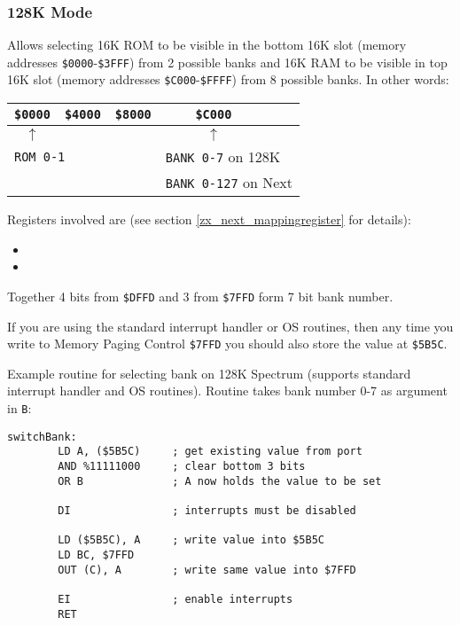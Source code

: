\documentclass[12pt,twoside,openright,a4paper]{book}
\begin{document}
\subsubsection{128K Mode}

Allows selecting 16K ROM to be visible in the bottom 16K slot (memory addresses {\tt \$0000}-{\tt \$3FFF}) from 2 possible banks and 16K RAM to be visible in top 16K slot (memory addresses {\tt \$C000}-{\tt \$FFFF}) from 8 possible banks. In other words:

\begin{tabular}{ccccl}
	{\tt \$0000} & {\tt \$4000} & {\tt \$8000} & {\tt \$C000} & \\
	\hline
	$\uparrow$ & & & $\uparrow$ & \\
	\multicolumn{2}{l}{\tt ROM 0-1} & & \multicolumn{2}{l}{{\tt BANK 0-7} on 128K} \\
	& & & \multicolumn{2}{l}{{\tt BANK 0-127} on Next} \\
\end{tabular}

Registers involved are (see section \ref{zx_next_mappingregister} for details):

\begin{itemize}[topsep=1pt,itemsep=1pt]
	\item {}
	\item {}
\end{itemize}

Together 4 bits from {\tt \$DFFD} and 3 from {\tt \$7FFD} form 7 bit bank number.

If you are using the standard interrupt handler or OS routines, then any time you write to Memory Paging Control {\tt \$7FFD} you should also store the value at {\tt \$5B5C}.

Example routine for selecting bank on 128K Spectrum (supports standard interrupt handler and OS routines). Routine takes bank number 0-7 as argument in {\tt B}:

\begin{Verbatim}[gobble=1]
	switchBank:
		LD A, ($5B5C)     ; get existing value from port
		AND %11111000     ; clear bottom 3 bits
		OR B              ; A now holds the value to be set

		DI                ; interrupts must be disabled

		LD ($5B5C), A     ; write value into $5B5C
		LD BC, $7FFD
		OUT (C), A        ; write same value into $7FFD

		EI                ; enable interrupts
		RET
\end{Verbatim}
\end{document}
